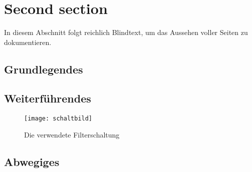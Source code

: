 
\chapter{Second section}\label{ch.test}

In diesem Abschnitt folgt reichlich Blindtext, um das Aussehen voller Seiten zu
dokumentieren. 

\section{Grundlegendes}

\begin{neu}
  \blindtext {}
\end{neu}
\blindtext 

\section{Weiterführendes} 

\begin{neu}
  \blindtext
\end{neu}

\blindtext
\blindenumerate
\blindtext[3] 

\begin{figure}[bht]
  \begin{center}
    \texttt{[image: schaltbild]}
    \caption{Die verwendete Filterschaltung}
    \label{fig.Filterschaltung}
  \end{center}
\end{figure}

\blinditemize[8]
\Blindtext[2][2]
\blinddescription {}  

\section{Abwegiges}

\blindtext

